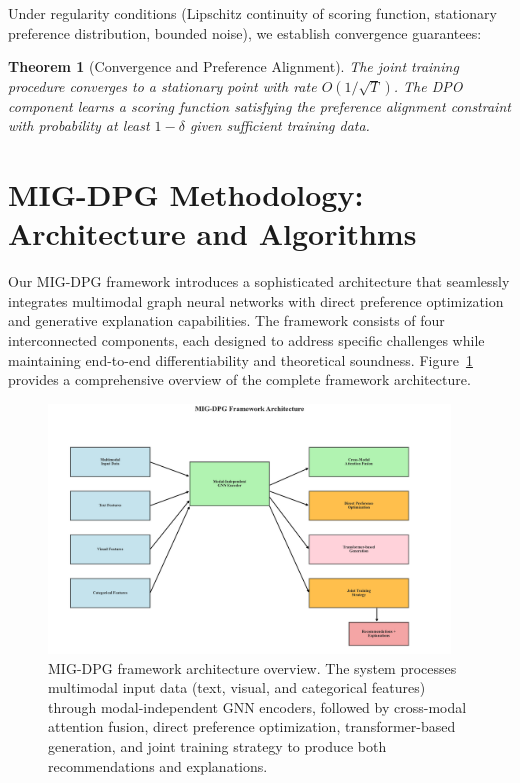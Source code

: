 \documentclass[pdflatex,sn-mathphys-num]{sn-jnl}%
\theoremstyle{thmstyleone}%
\newtheorem{theorem}{Theorem}%
\theoremstyle{thmstyletwo}%
\theoremstyle{thmstylethree}%
\begin{document}
Under regularity conditions (Lipschitz continuity of scoring function, stationary preference distribution, bounded noise), we establish convergence guarantees:

\begin{theorem}[Convergence and Preference Alignment]
The joint training procedure converges to a stationary point with rate $O(1/\sqrt{T})$. The DPO component learns a scoring function satisfying the preference alignment constraint with probability at least $1-\delta$ given sufficient training data.
\end{theorem}

\section{MIG-DPG Methodology: Architecture and Algorithms}\label{sec:method}

Our MIG-DPG framework introduces a sophisticated architecture that seamlessly integrates multimodal graph neural networks with direct preference optimization and generative explanation capabilities. The framework consists of four interconnected components, each designed to address specific challenges while maintaining end-to-end differentiability and theoretical soundness. Figure~\ref{fig:architecture} provides a comprehensive overview of the complete framework architecture.

\begin{figure}[t]
\centering
\includegraphics[width=0.95\textwidth]{figures/architecture_diagram.pdf}
\caption{MIG-DPG framework architecture overview. The system processes multimodal input data (text, visual, and categorical features) through modal-independent GNN encoders, followed by cross-modal attention fusion, direct preference optimization, transformer-based generation, and joint training strategy to produce both recommendations and explanations.}
\label{fig:architecture}
\end{figure}
\end{document}
